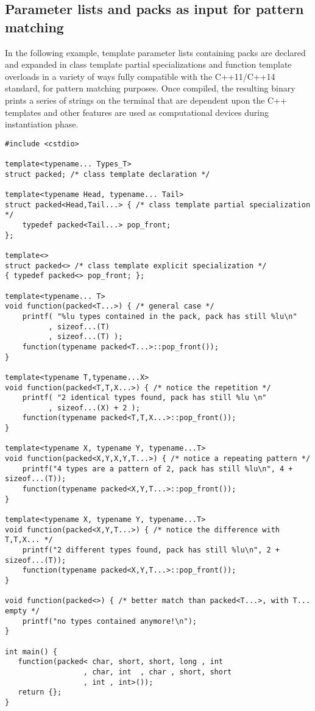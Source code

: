 \documentclass[ notitlepage
              , a4paper
              , twoside ]{article}
\newcommand{\parnum}{\bfseries\arabic{parcount}}
\newcounter{parcount}
\newcommand\p{%
    \stepcounter{parcount}%
    \leavevmode\marginpar[\hfill\parnum]{\parnum}%
}
\begin{document}
\subsection{Parameter lists and packs as input for pattern matching}
\p In the following example, template parameter lists containing packs are declared and expanded in class template partial specializations and function template overloads in a variety of ways fully compatible with the C++11/C++14 standard, for pattern matching purposes.
Once compiled, the resulting binary prints a series of strings on the terminal that are dependent upon the C++ templates and other features are used as computational devices during instantiation phase.

\begin{verbatim}
#include <cstdio>

template<typename... Types_T>
struct packed; /* class template declaration */

template<typename Head, typename... Tail>
struct packed<Head,Tail...> { /* class template partial specialization */
    typedef packed<Tail...> pop_front;
};

template<>
struct packed<> /* class template explicit specialization */
{ typedef packed<> pop_front; };

template<typename... T>
void function(packed<T...>) { /* general case */
    printf( "%lu types contained in the pack, pack has still %lu\n"
          , sizeof...(T)
          , sizeof...(T) );
    function(typename packed<T...>::pop_front());
}

template<typename T,typename...X>
void function(packed<T,T,X...>) { /* notice the repetition */
    printf( "2 identical types found, pack has still %lu \n"
          , sizeof...(X) + 2 );
    function(typename packed<T,T,X...>::pop_front());
}

template<typename X, typename Y, typename...T>
void function(packed<X,Y,X,Y,T...>) { /* notice a repeating pattern */
    printf("4 types are a pattern of 2, pack has still %lu\n", 4 + sizeof...(T));
    function(typename packed<X,Y,T...>::pop_front());
}

template<typename X, typename Y, typename...T>
void function(packed<X,Y,T...>) { /* notice the difference with T,T,X... */
    printf("2 different types found, pack has still %lu\n", 2 + sizeof...(T));
    function(typename packed<X,Y,T...>::pop_front());
}

void function(packed<>) { /* better match than packed<T...>, with T... empty */
    printf("no types contained anymore!\n");
}

int main() {
   function(packed< char, short, short, long , int
                  , char, int  , char , short, short
                  , int , int>());
   return {};
}
\end{verbatim}
\end{document}
